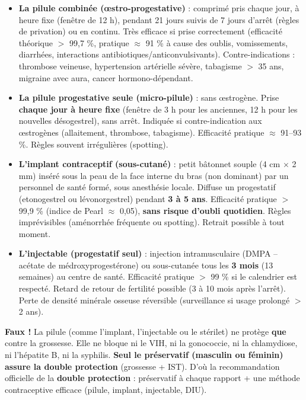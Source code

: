\documentclass[11pt]{article}
\begin{document}
\begin{itemize}
\item \textbf{La pilule combinée (œstro-progestative)} : comprimé pris chaque jour, à heure fixe (fenêtre de 12 h), pendant 21 jours suivis de 7 jours d'arrêt (règles de privation) ou en continu. Très efficace si prise correctement (efficacité théorique $>$ 99,7 \%, pratique $\approx$ 91 \% à cause des oublis, vomissements, diarrhées, interactions antibiotiques/anticonvulsivants). Contre-indications : thrombose veineuse, hypertension artérielle sévère, tabagisme $>$ 35 ans, migraine avec aura, cancer hormono-dépendant.
\item \textbf{La pilule progestative seule (micro-pilule)} : sans œstrogène. Prise \textbf{chaque jour à heure fixe} (fenêtre de 3 h pour les anciennes, 12 h pour les nouvelles désogestrel), sans arrêt. Indiquée si contre-indication aux œstrogènes (allaitement, thrombose, tabagisme). Efficacité pratique $\approx$ 91--93 \%. Règles souvent irrégulières (spotting).
\item \textbf{L'implant contraceptif (sous-cutané)} : petit bâtonnet souple (4 cm $\times$ 2 mm) inséré sous la peau de la face interne du bras (non dominant) par un personnel de santé formé, sous anesthésie locale. Diffuse un progestatif (etonogestrel ou lévonorgestrel) pendant \textbf{3 à 5 ans}. Efficacité pratique $>$ 99,9 \% (indice de Pearl $\approx$ 0,05), \textbf{sans risque d'oubli quotidien}. Règles imprévisibles (aménorrhée fréquente ou spotting). Retrait possible à tout moment.
\item \textbf{L'injectable (progestatif seul)} : injection intramusculaire (DMPA -- acétate de médroxyprogestérone) ou sous-cutanée tous les \textbf{3 mois} (13 semaines) au centre de santé. Efficacité pratique $>$ 99 \% si le calendrier est respecté. Retard de retour de fertilité possible (3 à 10 mois après l'arrêt). Perte de densité minérale osseuse réversible (surveillance si usage prolongé $>$ 2 ans).
\end{itemize}

\begin{attention}
\textbf{Faux !} La pilule (comme l'implant, l'injectable ou le stérilet) ne protège \textbf{que} contre la grossesse. Elle ne bloque ni le VIH, ni la gonococcie, ni la chlamydiose, ni l'hépatite B, ni la syphilis. \textbf{Seul le préservatif (masculin ou féminin) assure la double protection} (grossesse + IST). D'où la recommandation officielle de la \textbf{double protection} : préservatif à chaque rapport + une méthode contraceptive efficace (pilule, implant, injectable, DIU).
\end{attention}
\end{document}
